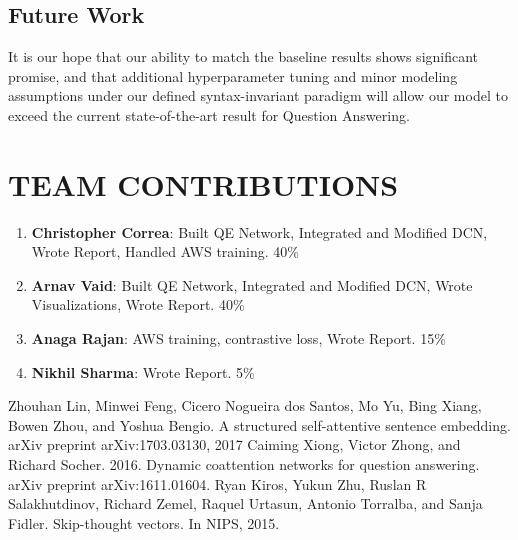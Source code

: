 \documentclass[a4paper, 11pt]{article}
\begin{document}
\subsection{Future Work}
It is our hope that our ability to match the baseline results shows significant promise, and that additional hyperparameter tuning and minor modeling assumptions under our defined syntax-invariant paradigm will allow our model to exceed the current state-of-the-art result for Question Answering.

\section{TEAM CONTRIBUTIONS}
\begin{enumerate}
	\item \textbf{Christopher Correa}: Built QE Network, Integrated and Modified DCN, Wrote Report, Handled AWS training.  40\%
    \item \textbf{Arnav Vaid}: Built QE Network, Integrated and Modified DCN, Wrote Visualizations, Wrote Report. 40\%
    \item \textbf{Anaga Rajan}: AWS training, contrastive loss, Wrote Report.  15\%
    \item \textbf{Nikhil Sharma}: Wrote Report.  5\%
\end{enumerate}


\addtolength{\textheight}{-12cm}   %








\begin{thebibliography}{99}

Zhouhan Lin, Minwei Feng, Cicero Nogueira dos Santos, Mo Yu, 
      Bing Xiang, Bowen Zhou, and Yoshua Bengio. A structured 
      self-attentive sentence embedding. arXiv preprint 
      arXiv:1703.03130, 2017
Caiming Xiong, Victor Zhong, and Richard Socher. 2016.  
      Dynamic coattention networks for question answering.  arXiv 
      preprint arXiv:1611.01604.
 Ryan Kiros, Yukun Zhu, Ruslan R Salakhutdinov, Richard Zemel, 
      Raquel Urtasun, Antonio Torralba, and Sanja Fidler. 
      Skip-thought vectors. In NIPS, 2015.




\end{thebibliography}
\end{document}
